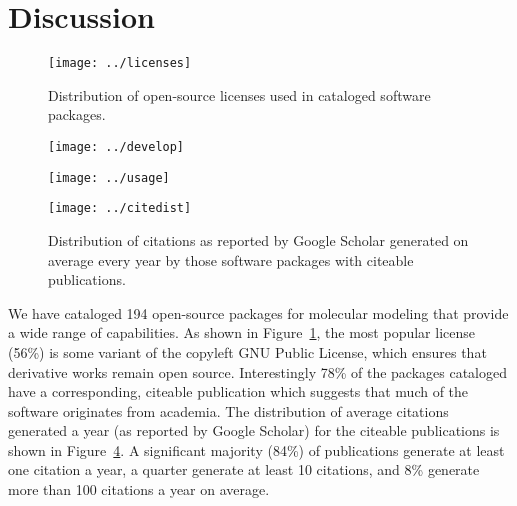\section{Discussion}

\begin{figure}
\centering 
\texttt{[image: ../licenses]}
\caption{\label{licenses} Distribution of open-source licenses used in cataloged software packages.}
\end{figure}

\begin{figure*}
\centering
\begin{subfigure}[t]{.4\linewidth}
\centering 
\texttt{[image: ../develop]}
\caption{\label{develop}}
\end{subfigure}
\hfill
\begin{subfigure}[t]{.4\linewidth}
\centering 
\texttt{[image: ../usage]}
\caption{\label{usage}}
\end{subfigure}
\caption{\label{pies} Activity distributions of cataloged software packages.
() Distribution of development activity. () Distribution of user activity.
}
\end{figure*}

\begin{figure}
\centering 
\texttt{[image: ../citedist]}
\caption{\label{cites} Distribution of citations as reported by Google Scholar generated on average every year by those software packages with citeable publications.}
\end{figure}


We have cataloged 194 open-source packages for molecular modeling that provide a wide range of capabilities.  As shown in Figure~\ref{licenses}, the most popular license (56\%) is some variant of the copyleft GNU Public License, which ensures that derivative works remain open source.  Interestingly 78\% of the packages cataloged have a corresponding, citeable publication which suggests that much of the software originates from academia.   The distribution of average citations generated a year (as reported by Google Scholar) for the citeable publications is shown in Figure~\ref{cites}.  A significant majority (84\%) of publications generate at least one citation a year, a quarter generate at least 10 citations, and 8\% generate more than 100 citations a year on average.

